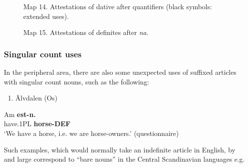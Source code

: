 \begin{figure}[h]
\centering
\begin{minipage}{4.98333in}
Map 14. Attestations of dative after quantifiers (black symbols: extended uses).
\end{minipage}
\end{figure}
\begin{figure}[h]
\centering
\begin{minipage}{4.75in}
Map 15. Attestations of definites after \textit{na}.
\end{minipage}
\end{figure}
\clearpage\subsubsection[Singular count uses]{\rmfamily Singular count uses}
\label{bkm:Ref224379285}%
In the peripheral area, there are also some unexpected uses of suffixed articles with singular count nouns, such as the following:

\begin{enumerate} %
\item 
\label{bkm:Ref224102863}Älvdalen (Os)

\end{enumerate} %
\ea\label{}
\gll Am  \textbf{est-n.}\\


have.1PL  \textbf{horse-DEF}\\ %


‘We have a horse, i.e. we are horse-owners.’ (questionnaire)
\z


Such examples, which would normally take an indefinite article in English, by and large correspond to “bare nouns” in the Central Scandinavian languages e.g.

